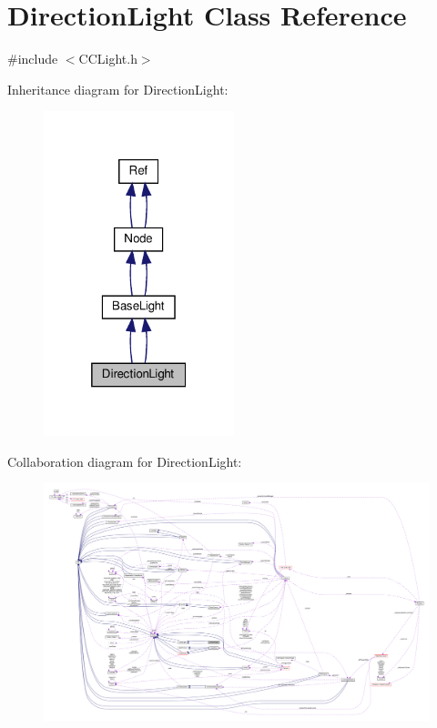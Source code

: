 \hypertarget{classDirectionLight}{}\section{Direction\+Light Class Reference}
\label{classDirectionLight}


{\ttfamily \#include $<$C\+C\+Light.\+h$>$}



Inheritance diagram for Direction\+Light\+:
\nopagebreak
\begin{figure}[H]
\begin{center}
\leavevmode
\includegraphics[width=157pt]{classDirectionLight__inherit__graph}
\end{center}
\end{figure}


Collaboration diagram for Direction\+Light\+:
\nopagebreak
\begin{figure}[H]
\begin{center}
\leavevmode
\includegraphics[width=350pt]{classDirectionLight__coll__graph}
\end{center}
\end{figure}
